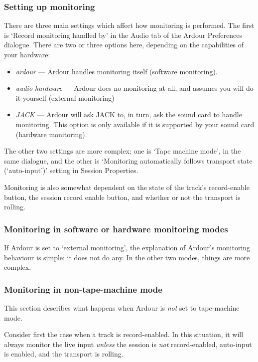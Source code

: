 \documentclass[10pt,a4paper]{book}
\newcommand{\dialogue}[1]{#1}
\newcommand{\tab}[1]{#1}
\begin{document}
\subsubsection{Setting up monitoring}

There are three main settings which affect how monitoring is
performed.  The first is `Record monitoring handled by' in the
\tab{Audio} tab of the \dialogue{Ardour Preferences} dialogue.  There are
two or three options here, depending on the capabilities of your
hardware:

\begin{itemize}
\item \emph{ardour} --- Ardour handles monitoring itself (software monitoring).
\item \emph{audio hardware} --- Ardour does no monitoring at all, and
  assumes you will do it yourself (external monitoring)
\item \emph{JACK} --- Ardour will ask JACK to, in turn, ask the sound
  card to handle monitoring.  This option is only available if it is
  supported by your sound card (hardware monitoring).
\end{itemize}

The other two settings are more complex; one is `Tape machine mode',
in the same dialogue, and the other is `Monitoring automatically
follows transport state (`auto-input')' setting in \dialogue{Session
  Properties}.

Monitoring is also somewhat dependent on the state of the track's
record-enable button, the session record enable button, and whether or
not the transport is rolling.


\subsubsection{Monitoring in software or hardware monitoring modes}

If Ardour is set to `external monitoring', the explanation of Ardour's
monitoring behaviour is simple: it does not do any.  In the other two
modes, things are more complex.


\subsubsection{Monitoring in non-tape-machine mode}

This section describes what happens when Ardour is \emph{not} set to
tape-machine mode.

Consider first the case when a track is record-enabled.  In this
situation, it will always monitor the live input \emph{unless} the
session is \emph{not} record-enabled, auto-input is enabled, and the
transport is rolling.  
\end{document}
